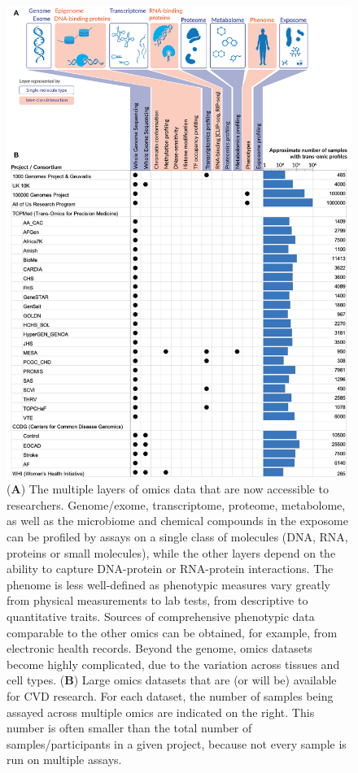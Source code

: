 \documentclass[letter]{bioinfo}
\begin{document}
    	\begin{figure}[!tpb]
	\includegraphics[width=1\linewidth]{trans-omics-data-sets.png}
		\caption{(\textbf{A}) The multiple layers of omics data that are now accessible to researchers. Genome/exome, transcriptome, proteome, metabolome, as well as the microbiome and chemical compounds in the exposome can be profiled by assays on a single class of molecules (DNA, RNA, proteins or small molecules), while the other layers depend on the ability to capture DNA-protein or RNA-protein interactions. The phenome is less well-defined as phenotypic measures vary greatly from physical measurements to lab tests, from descriptive to quantitative traits. Sources of comprehensive phenotypic data comparable to the other omics can be obtained, for example, from electronic health records.
		Beyond the genome, omics datasets become highly complicated, due to the variation across tissues and cell types.
		(\textbf{B}) Large omics datasets that are (or will be) available for CVD research. For each dataset, the number of samples being assayed across multiple omics are indicated on the right. This number is often smaller than the total number of samples/participants in a given project, because not every sample is run on multiple assays.}
		\label{fig:trans-omics}
	\end{figure} 
	
\end{document}
